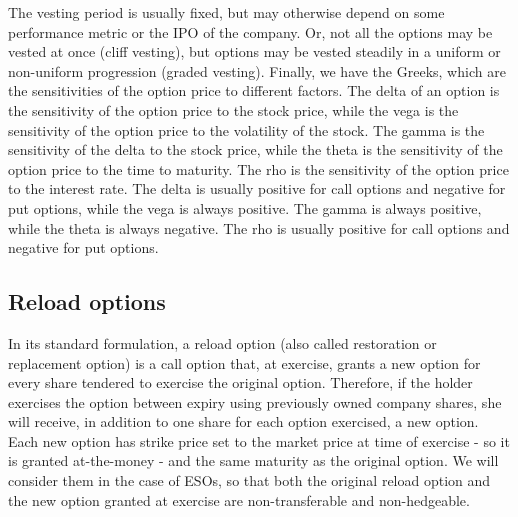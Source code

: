     

    The vesting period is usually fixed, but may otherwise depend on some performance metric or the IPO of the company. Or, not all the options may be vested at once (cliff vesting), but options may be vested steadily in a uniform or non-uniform progression (graded vesting).
    Finally, we have the Greeks, which are the sensitivities of the option price to different factors.
    The delta of an option is the sensitivity of the option price to the stock price, while the vega is the sensitivity of the option price to the volatility of the stock. The gamma is the sensitivity of the delta to the stock price, while the theta is the sensitivity of the option price to the time to maturity. The rho is the sensitivity of the option price to the interest rate. The delta is usually positive for call options and negative for put options, while the vega is always positive. The gamma is always positive, while the theta is always negative. The rho is usually positive for call options and negative for put options.


\subsection{Reload options} %
    In its standard formulation, a reload option (also called restoration or replacement option) is a call option that, at exercise, grants a new option for every share tendered to exercise the original option. Therefore, if the holder exercises the option between expiry using previously owned company shares, she will receive, in addition to one share for each option exercised, a new option. Each new option has strike price set to the market price at time of exercise - so it is granted at-the-money - and the same maturity as the original option. We will consider them in the case of ESOs, so that both the original reload option and the new option granted at exercise are non-transferable and non-hedgeable.    

